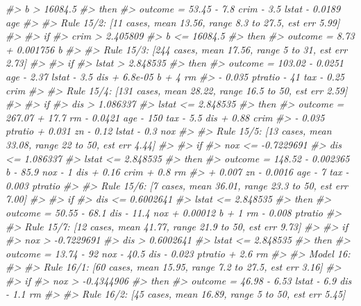 \documentclass[]{book}
\newenvironment{Shaded}{\begin{snugshade}}{\end{snugshade}}
\newcommand{\CommentTok}[1]{\textcolor[rgb]{0.56,0.35,0.01}{\textit{#1}}}
\begin{document}
\begin{Shaded}
\begin{Highlighting}[]
\CommentTok{#>  b > 16084.5}
\CommentTok{#>     then}
\CommentTok{#>  outcome = 53.45 - 7.8 crim - 3.5 lstat - 0.0189 age}
\CommentTok{#> }
\CommentTok{#>   Rule 15/2: [11 cases, mean 13.56, range 8.3 to 27.5, est err 5.99]}
\CommentTok{#> }
\CommentTok{#>     if}
\CommentTok{#>  crim > 2.405809}
\CommentTok{#>  b <= 16084.5}
\CommentTok{#>     then}
\CommentTok{#>  outcome = 8.73 + 0.001756 b}
\CommentTok{#> }
\CommentTok{#>   Rule 15/3: [244 cases, mean 17.56, range 5 to 31, est err 2.73]}
\CommentTok{#> }
\CommentTok{#>     if}
\CommentTok{#>  lstat > 2.848535}
\CommentTok{#>     then}
\CommentTok{#>  outcome = 103.02 - 0.0251 age - 2.37 lstat - 3.5 dis + 6.8e-05 b + 4 rm}
\CommentTok{#>            - 0.035 ptratio - 41 tax - 0.25 crim}
\CommentTok{#> }
\CommentTok{#>   Rule 15/4: [131 cases, mean 28.22, range 16.5 to 50, est err 2.59]}
\CommentTok{#> }
\CommentTok{#>     if}
\CommentTok{#>  dis > 1.086337}
\CommentTok{#>  lstat <= 2.848535}
\CommentTok{#>     then}
\CommentTok{#>  outcome = 267.07 + 17.7 rm - 0.0421 age - 150 tax - 5.5 dis + 0.88 crim}
\CommentTok{#>            - 0.035 ptratio + 0.031 zn - 0.12 lstat - 0.3 nox}
\CommentTok{#> }
\CommentTok{#>   Rule 15/5: [13 cases, mean 33.08, range 22 to 50, est err 4.44]}
\CommentTok{#> }
\CommentTok{#>     if}
\CommentTok{#>  nox <= -0.7229691}
\CommentTok{#>  dis <= 1.086337}
\CommentTok{#>  lstat <= 2.848535}
\CommentTok{#>     then}
\CommentTok{#>  outcome = 148.52 - 0.002365 b - 85.9 nox - 1 dis + 0.16 crim + 0.8 rm}
\CommentTok{#>            + 0.007 zn - 0.0016 age - 7 tax - 0.003 ptratio}
\CommentTok{#> }
\CommentTok{#>   Rule 15/6: [7 cases, mean 36.01, range 23.3 to 50, est err 7.00]}
\CommentTok{#> }
\CommentTok{#>     if}
\CommentTok{#>  dis <= 0.6002641}
\CommentTok{#>  lstat <= 2.848535}
\CommentTok{#>     then}
\CommentTok{#>  outcome = 50.55 - 68.1 dis - 11.4 nox + 0.00012 b + 1 rm - 0.008 ptratio}
\CommentTok{#> }
\CommentTok{#>   Rule 15/7: [12 cases, mean 41.77, range 21.9 to 50, est err 9.73]}
\CommentTok{#> }
\CommentTok{#>     if}
\CommentTok{#>  nox > -0.7229691}
\CommentTok{#>  dis > 0.6002641}
\CommentTok{#>  lstat <= 2.848535}
\CommentTok{#>     then}
\CommentTok{#>  outcome = 13.74 - 92 nox - 40.5 dis - 0.023 ptratio + 2.6 rm}
\CommentTok{#> }
\CommentTok{#> Model 16:}
\CommentTok{#> }
\CommentTok{#>   Rule 16/1: [60 cases, mean 15.95, range 7.2 to 27.5, est err 3.16]}
\CommentTok{#> }
\CommentTok{#>     if}
\CommentTok{#>  nox > -0.4344906}
\CommentTok{#>     then}
\CommentTok{#>  outcome = 46.98 - 6.53 lstat - 6.9 dis - 1.1 rm}
\CommentTok{#> }
\CommentTok{#>   Rule 16/2: [45 cases, mean 16.89, range 5 to 50, est err 5.45]}

\end{Highlighting}
\end{Shaded}
\end{document}

